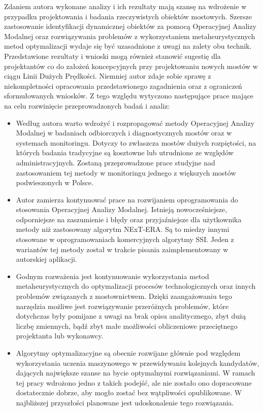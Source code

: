 Zdaniem autora wykonane analizy i ich rezultaty mają szansę na wdrożenie w przypadku projektowania i badania rzeczywistych obiektów mostowych. Szersze zastosowanie identyfikacji dynamicznej obiektów za pomocą Operacyjnej Analizy Modalnej oraz rozwiązywania problemów z wykorzystaniem metaheurystycznych metod optymalizacji wydaje się być uzasadnione z uwagi na zalety obu technik. Przedstawione rezultaty i wnioski mogą również stanowić sugestię dla projektantów co do założeń koncepcyjnych przy projektowaniu nowych mostów w ciągu Linii Dużych Prędkości. Niemniej autor zdaje sobie sprawę z niekompletności opracowania przedstawionego zagadnienia oraz z ograniczeń sformułowanych wniosków. Z tego względu wytyczono następujące prace mające na celu rozwinięcie przeprowadzonych badań i analiz:
\begin{itemize}
	\item Według autora warto wdrożyć i rozpropagować metody Operacyjnej Analizy Modalnej w badaniach odbiorczych i diagnostycznych mostów oraz w systemach monitoringu. Dotyczy to zwłaszcza mostów dużych rozpiętości, na których badania tradycyjne są kosztowne lub utrudnione ze względów administracyjnych. Zostaną przeprowadzone prace studyjne nad zastosowaniem tej metody w monitoringu jednego z większych mostów podwieszonych w Polsce.
	\item Autor zamierza kontynuować prace na rozwijaniem oprogramowania do stosowania Operacyjnej Analizy Modalnej. Istnieją nowocześniejsze, odporniejsze na zaszumienie i błędy oraz przyjaźniejsze dla użytkownika metody niż zastosowany algorytm NExT-ERA. Są to miedzy innymi stosowane w oprogramowaniach komercyjnych algorytmy SSI. Jeden z wariantów tej metody został w trakcie pisania zaimplementowany w autorskiej aplikacji.
	\item Godnym rozważenia jest kontynuowanie wykorzystania metod metaheurystycznych do optymalizacji procesów technologicznych oraz innych problemów związanych z mostownictwem. Dzięki zaangażowaniu tego narzędzia możliwe jest rozwiązywanie przeróżnych problemów, które dotychczas były pomijane z uwagi na brak opisu analitycznego, zbyt dużą liczbę zmiennych, bądź zbyt małe możliwości obliczeniowe przeciętnego projektanta lub wykonawcy.
	\item  Algorytmy optymalizacyjne są obecnie rozwijane głównie pod względem wykorzystania uczenia maszynowego w przewidywaniu kolejnych kandydatów, dających największe szanse na bycie optymalnymi rozwiązaniami. W ramach tej pracy wdrożono jedno z takich podejść, ale nie zostało ono dopracowane dostatecznie dobrze, aby mogło zostać bez wątpliwości opublikowane. W najbliższej przyszłości planowane jest udoskonalenie tego rozwiązania.
\end{itemize}  

